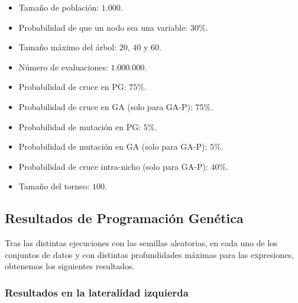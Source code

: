 \begin{itemize}
	\item Tamaño de población: $1.000$.
	\item Probabilidad de que un nodo sea una variable: $30\%$.
	\item Tamaño máximo del árbol: $20$, $40$ y $60$.
	\item Número de evaluaciones: $1.000.000$.
	\item Probabilidad de cruce en PG: $75\%$.
	\item Probabilidad de cruce en GA (solo para GA-P): $75\%$.
	\item Probabilidad de mutación en PG: $5\%$.
	\item Probabilidad de mutación en GA (solo para GA-P): $5\%$.
	\item Probabilidad de cruce intra-nicho (solo para GA-P): $40\%$.
	\item Tamaño del torneo: $100$.
\end{itemize}

\newpage

\subsection{Resultados de Programación Genética}

Tras las distintas ejecuciones con las semillas aleatorias, en cada uno de los conjuntos de datos y con distintas profundidades máximas para las expresiones, obtenemos los siguientes resultados.


\subsubsection{Resultados en la lateralidad izquierda}


